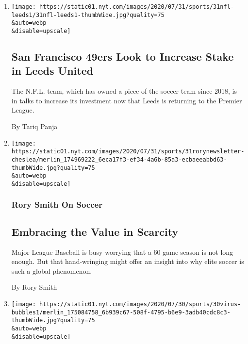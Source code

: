 \begin{enumerate}
\def\labelenumi{\arabic{enumi}.}
\item
  \href{/2020/07/31/sports/soccer/leeds-united-san-francisco-49ers.html}{}

  \texttt{[image: https://static01.nyt.com/images/2020/07/31/sports/31nfl-leeds1/31nfl-leeds1-thumbWide.jpg?quality=75\\\&auto=webp\\\&disable=upscale]}

  \hypertarget{san-francisco-49ers-look-to-increase-stake-in-leeds-united}{%
  \subsection{San Francisco 49ers Look to Increase Stake in Leeds
  United}\label{san-francisco-49ers-look-to-increase-stake-in-leeds-united}}

  The N.F.L. team, which has owned a piece of the soccer team since
  2018, is in talks to increase its investment now that Leeds is
  returning to the Premier League.

  By Tariq Panja
\item
  \href{/2020/07/31/sports/soccer/soccer-baseball.html}{}

  \texttt{[image: https://static01.nyt.com/images/2020/07/31/sports/31rorynewsletter-cheslea/merlin\_174969222\_6eca17f3-ef34-4a6b-85a3-ecbaeeabbd63-thumbWide.jpg?quality=75\\\&auto=webp\\\&disable=upscale]}

  \hypertarget{rory-smith-on-soccer}{%
  \subsubsection{Rory Smith On Soccer}\label{rory-smith-on-soccer}}

  \hypertarget{embracing-the-value-in-scarcity}{%
  \subsection{Embracing the Value in
  Scarcity}\label{embracing-the-value-in-scarcity}}

  Major League Baseball is busy worrying that a 60-game season is not
  long enough. But that hand-wringing might offer an insight into why
  elite soccer is such a global phenomenon.

  By Rory Smith
\item
  \href{/2020/07/30/sports/basketball/sports-bubble-nba-mlb.html}{}

  \texttt{[image: https://static01.nyt.com/images/2020/07/30/sports/30virus-bubbles1/merlin\_175084758\_6b939c67-508f-4795-b6e9-3adb40cdc8c3-thumbWide.jpg?quality=75\\\&auto=webp\\\&disable=upscale]}


\end{enumerate}
